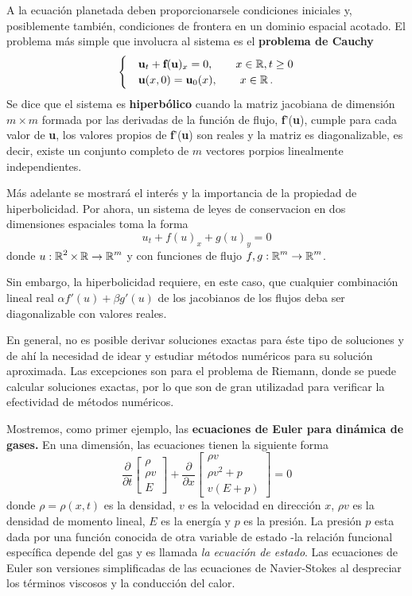 A la ecuación planetada deben proporcionarsele condiciones iniciales y, posiblemente también, condiciones de frontera en un dominio espacial acotado.  El problema más simple que involucra al sistema es el \textbf{problema de Cauchy}
\[
\begin{cases}
&\textbf{u}_t + \textbf{f}(\textbf{u})_x = 0, \qquad x \in \operatorname{\mathbb R}, t \geq 0 \\
&\textbf{u}(x,0) = \textbf{u}_0(x), \qquad x \in \operatorname{\mathbb R}.
\end{cases}
\]
Se dice que el sistema es \textbf{hiperbólico} cuando la matriz jacobiana de dimensión $m\times m$ formada por las derivadas de la función de flujo, \textbf{f}'(\textbf{u}), cumple para cada valor de \textbf{u}, los valores propios de \textbf{f}'(\textbf{u}) son reales y la matriz es diagonalizable, es decir, existe un conjunto completo de $m$ vectores porpios linealmente independientes.

Más adelante se mostrará el interés y la importancia de la propiedad de hiperbolicidad. Por ahora, un sistema de leyes de conservacion en dos dimensiones espaciales toma la forma
\[
u_t + f(u)_x + g(u)_y = 0
\]
donde $u:\operatorname{\mathbb R}^2\times \operatorname{\mathbb R} \rightarrow \operatorname{\mathbb R}^m$ y con funciones de flujo $f,g:\operatorname{\mathbb R}^m \rightarrow \operatorname{\mathbb R}^m$.

Sin embargo, la hiperbolicidad requiere, en este caso, que cualquier combinación lineal real $\alpha f'(u) + \beta g'(u)$ de los jacobianos de los flujos deba ser diagonalizable con valores reales.

En general, no es posible derivar soluciones exactas para éste tipo de soluciones y de ahí la necesidad de idear y estudiar métodos numéricos para su solución aproximada. Las excepciones son para el problema de Riemann, donde se puede calcular soluciones exactas, por lo que son de gran utilizadad para verificar la efectividad de métodos numéricos.

Mostremos, como primer ejemplo, las \textbf{ecuaciones de Euler para dinámica de gases.} En una dimensión, las ecuaciones tienen la siguiente forma
\[
\frac{\partial}{\partial t} 
\begin{bmatrix}
\rho \\
\rho v \\
E
\end{bmatrix}
+
\frac{\partial}{\partial x} 
\begin{bmatrix}
\rho v \\
\rho v^2 + p \\
v (E + p)
\end{bmatrix} = 0
\]
donde $\rho = \rho(x,t)$ es la densidad, $v$ es la velocidad en dirección $x$, $\rho v$ es la densidad de momento lineal, $E$ es la energía y $p$ es la presión. La presión $p$ esta dada por una función conocida de otra variable de estado -la relación funcional específica depende del gas y es llamada \textit{la ecuación de estado}. Las ecuaciones de Euler son versiones simplificadas de las ecuaciones de Navier-Stokes al despreciar los términos viscosos y la conducción del calor.

